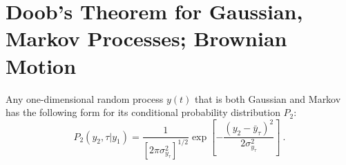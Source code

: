 \documentclass[12pt,a4paper]{article}
\begin{document}
\section{Doob's Theorem for Gaussian, Markov Processes; Brownian Motion}
Any one-dimensional random process $y(t)$ that is both Gaussian and Markov has the following form for its conditional probability distribution $P_2$:
\begin{equation*}
P_2(y_2, \tau|y_1) = \dfrac{1}{[2\pi \sigma_{y_\tau}^2 ]^{1/2}} \exp \left[-\dfrac{(y_2 -\bar{y}_\tau )^2}{2 \sigma_{y_\tau}^2} \right] ~.
\end{equation*}
\end{document}
